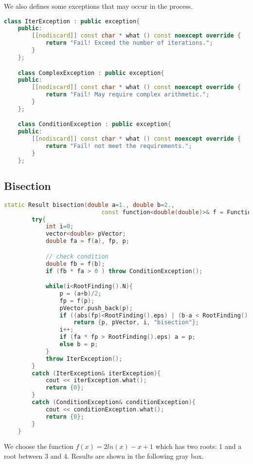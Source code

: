 \documentclass{article}
\begin{document}
    We also defines some exceptions that may occur in the process.

\begin{lstlisting}[language = c++]
class IterException : public exception{
    public:
        [[nodiscard]] const char * what () const noexcept override {
            return "Fail! Exceed the number of iterations.";
        }
    };

    class ComplexException : public exception{
    public:
        [[nodiscard]] const char * what () const noexcept override {
            return "Fail! May require complex arithmetic.";
        }
    };

    class ConditionException : public exception{
    public:
        [[nodiscard]] const char * what () const noexcept override {
            return "Fail! not meet the requirements.";
        }
    };

\end{lstlisting}

\subsection{Bisection}

\begin{lstlisting}[language=c++]
static Result bisection(double a=1., double b=2.,
                            const function<double(double)>& f = Function::f){
        try{
            int i=0;
            vector<double> pVector;
            double fa = f(a), fp, p;

            // check condition
            double fb = f(b);
            if (fb * fa > 0 ) throw ConditionException();

            while(i<RootFinding().N){
                p = (a+b)/2;
                fp = f(p);
                pVector.push_back(p);
                if ((abs(fp)<RootFinding().eps) | (b-a < RootFinding().TOL))
                    return {p, pVector, i, "bisection"};
                i++;
                if (fa * fp > RootFinding().eps) a = p;
                else b = p;
            }
            throw IterException();
        }
        catch (IterException& iterException){
            cout << iterException.what();
            return {0};
        }
        catch (ConditionException& conditionException){
            cout << conditionException.what();
            return {0};
        }
    }
\end{lstlisting}

We choose the function $f(x)=2ln(x)-x+1$ which has two roots: 1 and a root between 3 and 4. Results are shown in the following gray box.
\end{document}
